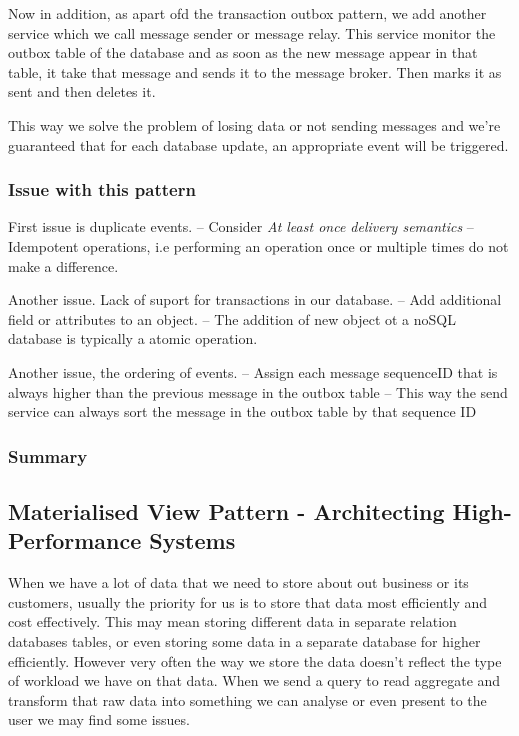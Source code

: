 \documentclass[a4paper, 11pt]{book}
\begin{document}
    Now in addition, as apart ofd the transaction outbox pattern, we add another service which we call message sender or message relay.
    This service monitor the outbox table of the database and as soon as the new message appear in that table, it take that message and sends it to the message broker.
    Then marks it as sent and then deletes it.

    This way we solve the problem of losing data or not sending messages and we're guaranteed that for each database update, an appropriate event will be triggered.

    \subsubsection{Issue with this pattern}
    First issue is duplicate events.
    -- Consider \textit{At least once delivery semantics}
    -- Idempotent operations, i.e performing an operation once or multiple times do not make a difference.

    Another issue. Lack of suport for transactions in our database.
    -- Add additional field or attributes to an object.
    -- The addition of new object ot a noSQL database is typically a atomic operation.

    Another issue, the ordering of events.
    -- Assign each message sequenceID that is always higher than the previous message in the outbox table
    -- This way the send service can always sort the message in the outbox table by that sequence ID

    \subsubsection{Summary}

    \subsection{Materialised View Pattern - Architecting High-Performance Systems}
    When we have a lot of data that we need to store about out business or its customers, usually the priority for us is to store that data most efficiently and cost effectively.
    This may mean storing different data in separate relation databases tables, or even storing some data in a separate database for higher efficiently.
    However very often the way we store the data doesn't reflect the type of workload we have on that data.
    When we send a query to read aggregate and transform that raw data into something we can analyse or even present to the user we may find some issues.
\end{document}
